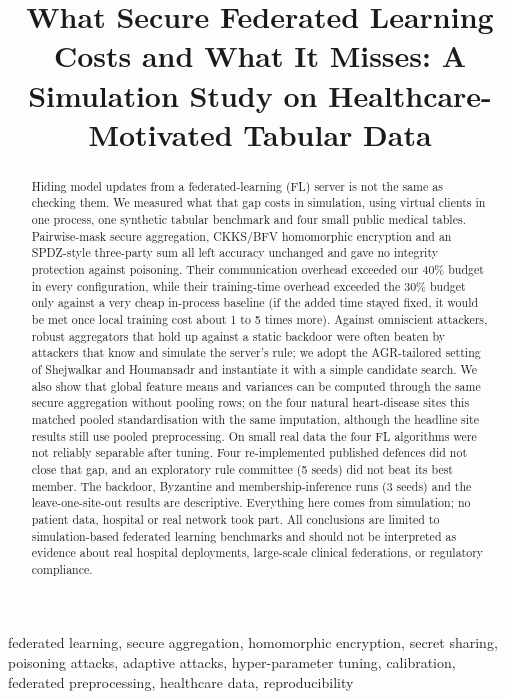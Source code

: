 \documentclass[conference]{IEEEtran}
\begin{document}
\title{What Secure Federated Learning Costs and What It Misses: A Simulation Study on Healthcare-Motivated Tabular Data}
\author{}
\maketitle
\begin{abstract}
Hiding model updates from a federated-learning (FL) server is not the same as checking them. We measured what that gap costs in simulation, using virtual clients in one process, one synthetic tabular benchmark and four small public medical tables. Pairwise-mask secure aggregation, CKKS/BFV homomorphic encryption and an SPDZ-style three-party sum all left accuracy unchanged and gave no integrity protection against poisoning. Their communication overhead exceeded our 40\% budget in every configuration, while their training-time overhead exceeded the 30\% budget only against a very cheap in-process baseline (if the added time stayed fixed, it would be met once local training cost about 1 to 5 times more).
Against omniscient attackers, robust aggregators that hold up against a static backdoor were often beaten by attackers that know and simulate the server's rule; we adopt the AGR-tailored setting of Shejwalkar and Houmansadr and instantiate it with a simple candidate search. We also show that global feature means and variances can be computed through the same secure aggregation without pooling rows; on the four natural heart-disease sites this matched pooled standardisation with the same imputation, although the headline site results still use pooled preprocessing. On small real data the four FL algorithms were not reliably separable after tuning. Four re-implemented published defences did not close that gap, and an exploratory rule committee (5 seeds) did not beat its best member. The backdoor, Byzantine and membership-inference runs (3 seeds) and the leave-one-site-out results are descriptive. Everything here comes from simulation; no patient data, hospital or real network took part. All conclusions are limited to simulation-based federated learning benchmarks and should not be interpreted as evidence about real hospital deployments, large-scale clinical federations, or regulatory compliance.
\end{abstract}
\begin{IEEEkeywords}
federated learning, secure aggregation, homomorphic encryption, secret sharing, poisoning attacks, adaptive attacks, hyper-parameter tuning, calibration, federated preprocessing, healthcare data, reproducibility
\end{IEEEkeywords}
\end{document}
